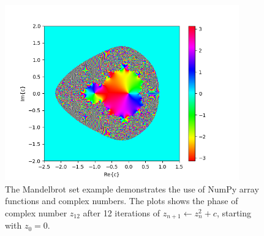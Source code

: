 \begin{enumerate}
\begin{figure}
\includegraphics[width=0.9\textwidth]{ch02/figures/mystery.png}
\caption{The Mandelbrot set example demonstrates the use of NumPy array functions and complex numbers. The plots
  shows the phase of complex number $z_{12}$ after 12 iterations of
  $z_{n+1} \leftarrow z_n^2 + c$, starting with $z_0 = 0$.}
\label{fig:mandelbrot}
\end{figure}



\end{enumerate}
